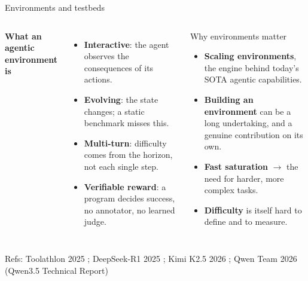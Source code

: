 \documentclass[aspectratio=169,10pt]{beamer}
\newcommand{\refs}[1]{\vfill{\tiny\textcolor{crMid}{Refs: #1}}}
\begin{document}
\begin{frame}{Environments and testbeds}
\begin{columns}[T]
\textbf{What an agentic environment is}
\begin{itemize}
  \item \textbf{Interactive}: the agent observes the consequences of its actions.
  \item \textbf{Evolving}: the state changes; a static benchmark misses this.
  \item \textbf{Multi-turn}: difficulty comes from the horizon, not each single step.
  \item \textbf{Verifiable reward}: a program decides success, no annotator, no learned judge.
\end{itemize}
\begin{block}{Why environments matter}
\small
\begin{itemize}
  \item \textbf{Scaling environments}, the engine behind today's SOTA agentic capabilities.
  \item \textbf{Building an environment} can be a long undertaking, and a genuine contribution on its own.
  \item \textbf{Fast saturation} $\to$ the need for harder, more complex tasks.
  \item \textbf{Difficulty} is itself hard to define and to measure.
\end{itemize}
\end{block}
\end{columns}
\refs{ Toolathlon 2025 ; DeepSeek-R1 2025 ; Kimi K2.5 2026 ; Qwen Team 2026 (Qwen3.5 Technical Report)}

\end{frame}
\end{document}
